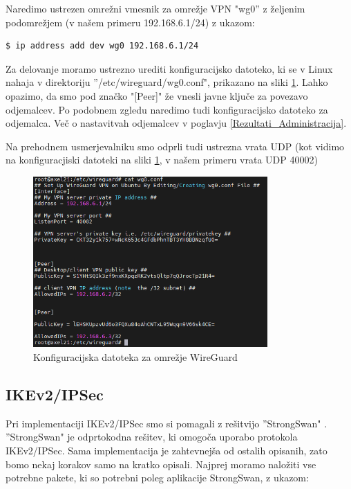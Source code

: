 \documentclass[a4paper, 12pt]{book}
\begin{document}
Naredimo ustrezen omrežni vmesnik za omrežje VPN "wg0'' z željenim podomrežjem (v našem primeru 192.168.6.1/24) z ukazom:
\begin{verbatim}
$ ip address add dev wg0 192.168.6.1/24
\end{verbatim}
 
Za delovanje moramo ustrezno urediti konfiguracijsko datoteko, ki se v Linux nahaja v direktoriju ''/etc/wireguard/wg0.conf", prikazano na sliki \ref{wireguard_conf}. Lahko opazimo, da smo pod značko "[Peer]" že vnesli javne ključe za povezavo odjemalcev. Po podobnem zgledu naredimo tudi konfiguracijsko datoteko za odjemalca. Več o nastavitvah odjemalcev v poglavju \ref{Rezultati_Administracija}.

Na prehodnem usmerjevalniku smo odprli tudi ustrezna vrata UDP (kot vidimo na konfiguracjiski datoteki na sliki \ref{wireguard_conf}, v našem primeru vrata UDP 40002)

\begin{figure}[h]
\begin{center}
\includegraphics[width=0.8\textwidth]{fotografije/WireGuard_Config_file_server.png}
\end{center}
\caption{Konfiguracijska datoteka za omrežje WireGuard \cite{rvidmar}}
\label{wireguard_conf}
\end{figure}

\subsection{IKEv2/IPSec} %

Pri implementaciji IKEv2/IPSec smo si pomagali z rešitvijo ''StrongSwan" \cite{noauthor_strongswan_nodate}. ''StrongSwan" je odprtokodna rešitev, ki omogoča uporabo protokola IKEv2/IPSec. Sama implementacija je zahtevnejša od ostalih opisanih, zato bomo nekaj korakov samo na kratko opisali.
Najprej moramo naložiti vse potrebne pakete, ki so potrebni poleg aplikacije StrongSwan, z ukazom:
\end{document}
